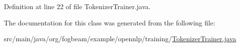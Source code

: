 Definition at line 22 of file Tokenizer\+Trainer.\+java.



The documentation for this class was generated from the following file\+:\begin{DoxyCompactItemize}
\item 
src/main/java/org/fogbeam/example/opennlp/training/\hyperlink{_tokenizer_trainer_8java}{Tokenizer\+Trainer.\+java}\end{DoxyCompactItemize}
